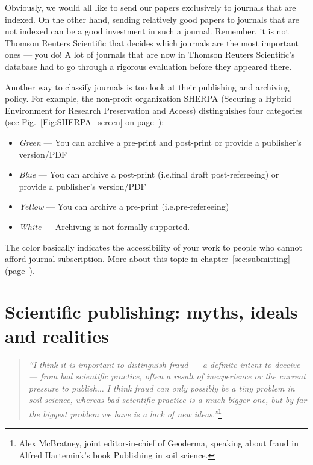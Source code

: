 \documentclass[graybox,envcountchap,sectrefs,UStrade]{svmono}
\begin{document}
Obviously, we would all like to send our papers exclusively to journals that are indexed. On the other hand, sending relatively good papers to journals that are not indexed can be a good investment in such a journal. Remember, it is not Thomson Reuters Scientific that decides which journals are the most important ones --- you do! A lot of journals that are now in Thomson Reuters Scientific's database had to go through a rigorous evaluation before they appeared there. \par

Another way to classify journals is too look at their publishing and archiving policy. For example, the non-profit organization SHERPA (Securing a Hybrid Environment for Research Preservation and Access) distinguishes four categories (see Fig.\@~\ref{Fig:SHERPA_screen} on page~\pageref{Fig:SHERPA_screen}):

\begin{itemize}
  \item \emph{Green} --- You can archive a pre-print and post-print or provide a publisher's version/PDF
  \item \emph{Blue} --- You can archive a post-print (i.e.\@ final draft post-refereeing) or provide a publisher's version/PDF
  \item \emph{Yellow} --- You can archive a pre-print (i.e.\@ pre-refereeing)
  \item \emph{White} --- Archiving is not formally supported.
\end{itemize}

The color basically indicates the accessibility of your work to people who cannot afford journal subscription. More about this topic in chapter~\ref{sec:submitting} (page~\pageref{sec:submitting}).\par



\chapter{Scientific publishing: myths, ideals and realities}


\begin{quote}
\emph{``I think it is important to distinguish fraud --- a definite intent to deceive --- from bad scientific practice, often a result of inexperience or the current pressure to publish$\ldots$ I think fraud can only possibly be a tiny problem in soil science, whereas bad scientific practice is a much bigger one, but by far the biggest problem we have is a lack of new ideas.''}\footnote{Alex McBratney, joint editor-in-chief of Geoderma, speaking about fraud in Alfred Hartemink's book Publishing in soil science.}
\end{quote}
\end{document}
